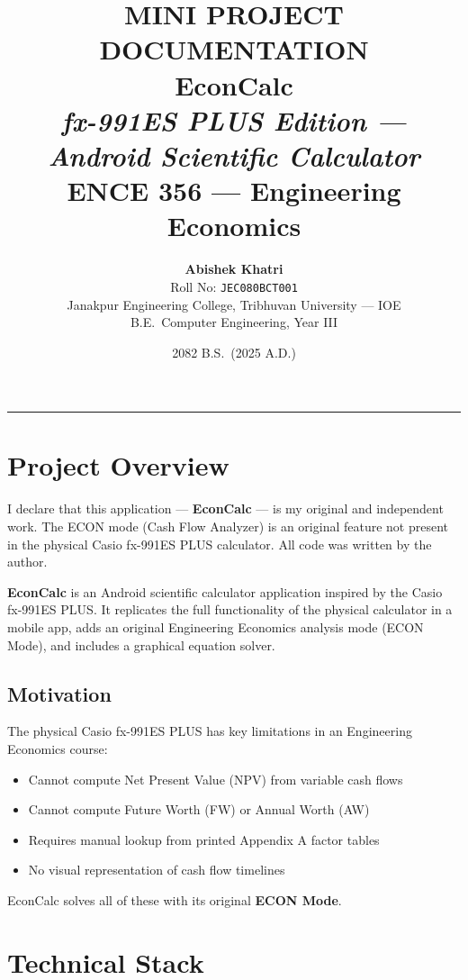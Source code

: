 \documentclass[12pt]{article}
\title{
  \vspace{-1cm}
  {\large\color{casio}\textbf{MINI PROJECT DOCUMENTATION}}\\[0.4em]
  {\Huge\textbf{EconCalc}}\\[0.3em]
  {\large\textit{fx-991ES PLUS Edition --- Android Scientific Calculator}}\\[0.2em]
  {\normalsize ENCE 356 --- Engineering Economics}
}
\author{
  \textbf{Abishek Khatri}\\
  Roll No: \texttt{JEC080BCT001}\\
  Janakpur Engineering College, Tribhuvan University --- IOE\\
  B.E.\ Computer Engineering, Year III
}
\date{2082 B.S.\ (2025 A.D.)}
\begin{document}
\maketitle
\begin{center}\color{casio}\rule{0.8\textwidth}{1.5pt}\end{center}
\vspace{0.5em}
\tableofcontents
\newpage

\section{Project Overview}

\begin{tcolorbox}[infobox,title=Declaration of Authorship]
I declare that this application --- \textbf{EconCalc} --- is my original and independent work.
The ECON mode (Cash Flow Analyzer) is an original feature not present in the physical
Casio fx-991ES PLUS calculator. All code was written by the author.
\end{tcolorbox}

\vspace{0.5em}
\textbf{EconCalc} is an Android scientific calculator application inspired by the Casio fx-991ES PLUS.
It replicates the full functionality of the physical calculator in a mobile app, adds an original
Engineering Economics analysis mode (ECON Mode), and includes a graphical equation solver.

\subsection{Motivation}
The physical Casio fx-991ES PLUS has key limitations in an Engineering Economics course:
\begin{itemize}[leftmargin=1.5em]
  \item Cannot compute Net Present Value (NPV) from variable cash flows
  \item Cannot compute Future Worth (FW) or Annual Worth (AW)
  \item Requires manual lookup from printed Appendix A factor tables
  \item No visual representation of cash flow timelines
\end{itemize}
EconCalc solves all of these with its original \textbf{ECON Mode}.

\section{Technical Stack}
\end{document}
